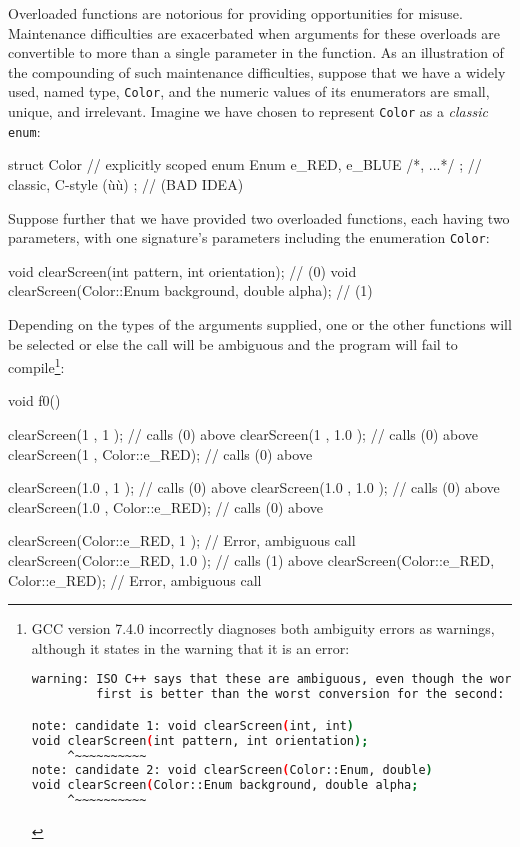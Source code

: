 Overloaded functions are notorious for providing opportunities for
misuse. Maintenance difficulties are exacerbated when arguments for
these overloads are convertible to more than a single parameter in the
function. As an illustration of the compounding of such maintenance
difficulties, suppose that we have a widely used, named type,
\texttt{Color}, and the numeric values of its enumerators are small,
unique, and irrelevant. Imagine we have chosen to represent
\texttt{Color} as a \emph{classic} \texttt{enum}:

\begin{emcppslisting}[emcppsbatch=e7]
struct Color
{                                           // explicitly scoped
    enum Enum { e_RED, e_BLUE /*, ...*/ };  // classic, C-style (ù{}ù)
};                                          // (BAD IDEA)
\end{emcppslisting}

\noindent Suppose further that we have provided two overloaded functions, each
having two parameters, with one signature's parameters including the
enumeration \texttt{Color}:

\begin{emcppslisting}[emcppsbatch=e7]
void clearScreen(int pattern, int orientation);          // (0)
void clearScreen(Color::Enum background, double alpha);  // (1)
\end{emcppslisting}

\noindent Depending on the types of the arguments supplied, one or the other
functions will be selected or else the call will be ambiguous and the
program will fail to compile{\cprotect\footnote{GCC version 7.4.0
incorrectly diagnoses both ambiguity errors as warnings, although it
states in the warning that it is an error:

\begin{lstlisting}[language=bash,basicstyle={\ttfamily\footnotesize}]
warning: ISO C++ says that these are ambiguous, even though the worst conversion for the
         first is better than the worst conversion for the second:

note: candidate 1: void clearScreen(int, int)
void clearScreen(int pattern, int orientation);
     ^~~~~~~~~~~
note: candidate 2: void clearScreen(Color::Enum, double)
void clearScreen(Color::Enum background, double alpha;
     ^~~~~~~~~~~
\end{lstlisting}
      }}:

\begin{emcppslisting}[emcppsbatch=e7]
void f0()
{
    clearScreen(1           , 1           );  // calls (0) above
    clearScreen(1           , 1.0         );  // calls (0) above
    clearScreen(1           , Color::e_RED);  // calls (0) above

    clearScreen(1.0         , 1           );  // calls (0) above
    clearScreen(1.0         , 1.0         );  // calls (0) above
    clearScreen(1.0         , Color::e_RED);  // calls (0) above

    clearScreen(Color::e_RED, 1           );  // Error, ambiguous call
    clearScreen(Color::e_RED, 1.0         );  // calls (1) above
    clearScreen(Color::e_RED, Color::e_RED);  // Error, ambiguous call
}
\end{emcppslisting}

